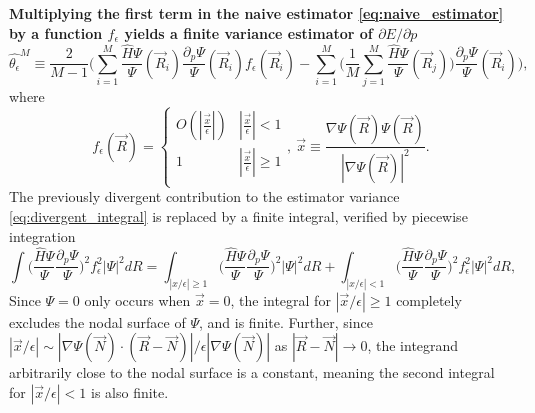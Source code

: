 \documentclass{article}
\begin{document}
\textbf{Multiplying the first term in the naive estimator \eqref{eq:naive_estimator} by a function $f_\epsilon$ yields a finite variance estimator of $\partial E/\partial p$}
\begin{equation}
\hat{\theta_\epsilon}^M \equiv \frac{2}{M-1} \Bigg(\sum_{i=1}^M \frac{\hat{H}\Psi}{\Psi}(\vec{R}_i)\frac{\partial_p \Psi}{\Psi}(\vec{R}_i) f_\epsilon(\vec{R}_i) - \sum_{i=1}^M \Big(\frac{1}{M} \sum_{j=1}^M \frac{\hat{H}\Psi}{\Psi}(\vec{R}_j)\Big)\frac{\partial_p \Psi}{\Psi}(\vec{R}_i)\Bigg), \label{eq:regularized_estimator}
\end{equation}
where 
\begin{equation}
f_\epsilon(\vec{R}) = \begin{cases} 
      O(|\frac{\vec{x}}{\epsilon}|) & |\frac{\vec{x}}{\epsilon}| < 1 \\
      1 & |\frac{\vec{x}}{\epsilon}| \ge 1 \\
   \end{cases},\ \vec{x} \equiv \frac{\nabla \Psi(\vec{R}) \Psi(\vec{R})}{|\nabla \Psi(\vec{R})|^2}.
\label{eq:regularizing_function}
\end{equation} 
The previously divergent contribution to the estimator variance \eqref{eq:divergent_integral} is replaced by a finite integral, verified by piecewise integration
\begin{equation}
\int \Big(\frac{\hat{H}\Psi}{\Psi}\frac{\partial_p\Psi}{\Psi}\Big)^2 f_\epsilon^2 |\Psi|^2 dR =\int_{|x/\epsilon|\geq 1} \Big(\frac{\hat{H}\Psi}{\Psi}\frac{\partial_p\Psi}{\Psi}\Big)^2 |\Psi|^2 dR + \int_{|x/\epsilon|< 1} \Big(\frac{\hat{H}\Psi}{\Psi}\frac{\partial_p\Psi}{\Psi}\Big)^2 f_\epsilon^2 |\Psi|^2 dR,
\label{eq:convergent_integral}
\end{equation}
Since $\Psi = 0$ only occurs when $\vec{x} = 0$, the integral for $|\vec{x}/\epsilon|\geq 1$ completely excludes the nodal surface of $\Psi$, and is finite. 
Further, since $|\vec{x}/\epsilon| \sim |\nabla\Psi(\vec{N}) \cdot (\vec{R}-\vec{N})|/\epsilon|\nabla  \Psi(\vec{N})|$ as $|\vec{R} - \vec{N}| \rightarrow 0$, the integrand arbitrarily close to the nodal surface is a constant, meaning the second integral for $|\vec{x}/\epsilon| < 1$ is also finite.
\end{document}
